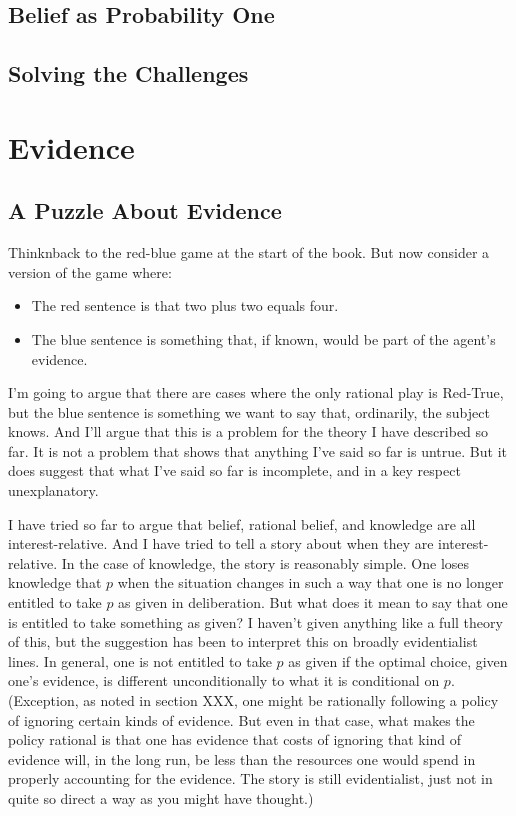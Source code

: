 \documentclass[11pt,]{book}
\providecommand{\tightlist}{%
  \setlength{\itemsep}{0pt}\setlength{\parskip}{0pt}}
\begin{document}
\hypertarget{probone}{%
\section{Belief as Probability One}\label{probone}}

\hypertarget{solving}{%
\section{Solving the Challenges}\label{solving}}

\hypertarget{evidence}{%
\chapter{Evidence}\label{evidence}}

\hypertarget{evpuzzle}{%
\section{A Puzzle About Evidence}\label{evpuzzle}}

Thinknback to the red-blue game at the start of the book. But now consider a version of the game where:

\begin{itemize}
\tightlist
\item
  The red sentence is that two plus two equals four.
\item
  The blue sentence is something that, if known, would be part of the
  agent's evidence.
\end{itemize}

I'm going to argue that there are cases where the only rational play is Red-True, but the blue sentence is something we want to say that, ordinarily, the subject knows. And I'll argue that this is a problem for the theory I have described so far. It is not a problem that shows that anything I've said so far is untrue. But it does suggest that what I've said so far is incomplete, and in a key respect unexplanatory.

I have tried so far to argue that belief, rational belief, and knowledge are all interest-relative. And I have tried to tell a story about when they are interest-relative. In the case of knowledge, the story is reasonably simple. One loses knowledge that \(p\) when the situation changes in such a way that one is no longer entitled to take \(p\) as given in deliberation. But what does it mean to say that one is entitled to take something as given? I haven't given anything like a full theory of this, but the suggestion has been to interpret this on broadly evidentialist lines. In general, one is not entitled to take \(p\) as given if the optimal choice, given one's evidence, is different unconditionally to what it is conditional on \(p\). (Exception, as noted in section XXX, one might be rationally following a policy of ignoring certain kinds of evidence. But even in that case, what makes the policy rational is that one has evidence that costs of ignoring that kind of evidence will, in the long run, be less than the resources one would spend in properly accounting for the evidence. The story is still evidentialist, just not in quite so direct a way as you might have thought.)
\end{document}
